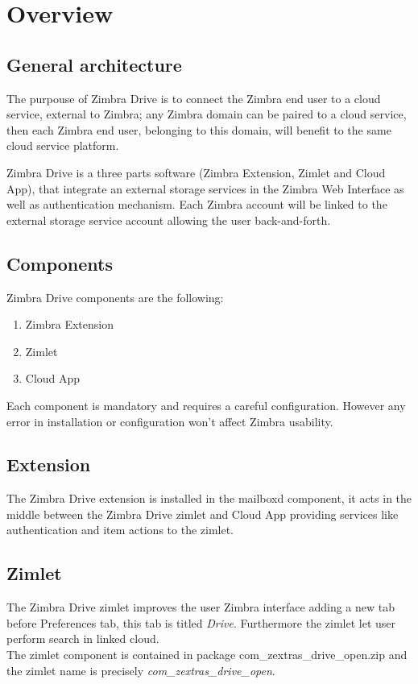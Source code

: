 \section{Overview}
\subsection{General architecture}\label{==subsec:general_architecture==}
    The purpouse of Zimbra Drive is to connect the Zimbra end user to a cloud service, external to Zimbra;
    any Zimbra domain can be paired to a cloud service, then each Zimbra end user, belonging to this domain,
    will benefit to the same cloud service platform.

    Zimbra Drive is a three parts software (Zimbra Extension, Zimlet and Cloud App),
    that integrate an external storage services in the Zimbra Web Interface as well as authentication mechanism.
    Each Zimbra account will be linked to the external storage service account allowing the user back-and-forth.
%

\subsection{Components}
    Zimbra Drive components are the following:
    \begin{enumerate}
        \item Zimbra Extension
        \item Zimlet
        \item Cloud App
    \end{enumerate}
    \begin{warning}
        Each component is mandatory and requires a careful configuration.
        However any error in installation or configuration won't affect Zimbra usability.
    \end{warning}

        \subsection{Extension}
        The Zimbra Drive extension is installed in the mailboxd component, it acts in the middle between the Zimbra
        Drive zimlet and Cloud App providing services like authentication and item actions to the zimlet.

        \subsection{Zimlet}
        The Zimbra Drive zimlet improves the user Zimbra interface adding a new tab before Preferences tab,
        this tab is titled \textit{Drive}. Furthermore the zimlet let user perform search in linked cloud.\\
        The zimlet component is contained in package com\_zextras\_drive\_open.zip and the zimlet name is precisely
        \textit{com\_zextras\_drive\_open}.

